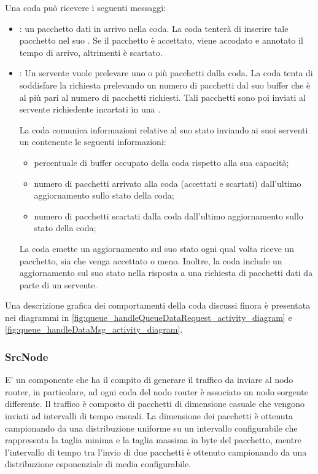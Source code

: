 \documentclass[conference]{IEEEtran}
\begin{document}
Una coda può ricevere i seguenti messaggi:
\begin{itemize}
    \item {}: un pacchetto dati in arrivo nella coda. La coda tenterà di
    inserire tale pacchetto nel suo . Se il pacchetto è accettato,
    viene accodato e annotato il tempo di arrivo, altrimenti è scartato.
    \item {}: Un servente vuole prelevare uno o più pacchetti
     dalla coda. La coda tenta di soddisfare la richiesta prelevando un numero di
     pacchetti dal suo buffer che è al più pari al numero di pacchetti richiesti.
     Tali pacchetti sono poi inviati al servente richiedente incartati in una
     .

La coda comunica informazioni relative al suo stato inviando ai suoi serventi un
 contenente le seguenti informazioni:
\begin{itemize}
    \item percentuale di buffer occupato della coda rispetto alla sua capacità;
    \item numero di pacchetti arrivato alla coda (accettati e scartati) dall'ultimo
    aggiornamento sullo stato della coda;
    \item numero di pacchetti scartati dalla coda dall'ultimo aggiornamento sullo stato
    della coda;
\end{itemize}
La coda emette un aggiornamento sul suo stato ogni qual volta riceve un pacchetto, sia
che venga accettato o meno. Inoltre, la coda include un aggiornamento sul suo stato
nella risposta a una richiesta di pacchetti dati da parte di un servente.    
\end{itemize}

Una descrizione grafica dei comportamenti della coda discussi finora è presentata
nei diagrammi in \autoref{fig:queue_handleQueueDataRequest_activity_diagram} e 
\autoref{fig:queue_handleDataMsg_activity_diagram}.

\subsubsection{SrcNode}
E' un componente che ha il compito di generare il traffico da inviare al nodo router, in particolare, ad ogni coda del nodo router è associato un nodo sorgente differente. Il traffico è composto di pacchetti di dimensione casuale che vengono inviati ad intervalli di tempo casuali. La dimensione dei pacchetti è ottenuta campionando da una distribuzione uniforme su un intervallo configurabile che rappresenta la taglia minima e la taglia massima in byte del pacchetto, mentre l'intervallo di tempo tra l'invio di due pacchetti è ottenuto campionando da una distribuzione esponenziale di media configurabile.
\end{document}
